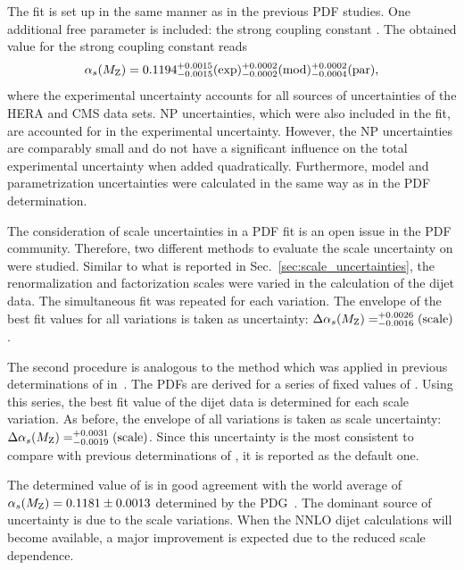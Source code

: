 The fit is set up in the same manner as
in the previous PDF studies. One additional free parameter is included: the
strong coupling constant \asmz. The obtained value for the strong coupling constant
reads
%
\begin{equation*}
  \alpha_{s}(M_\mathrm{Z}) = 0.1194_{-0.0015}^{+0.0015}(\mathrm{exp})_{-0.0002}^{+0.0002}(\mathrm{mod})_{-0.0004}^{+0.0002}(\mathrm{par}),
\end{equation*}
%
where the experimental uncertainty accounts for all sources of uncertainties of
the HERA and CMS data sets. NP uncertainties, which were also included in the
fit, are accounted for in the experimental uncertainty. However, the NP
uncertainties are comparably small and do not have a significant influence on the total
experimental uncertainty when added quadratically. Furthermore, model and parametrization uncertainties
were calculated in the same way as in the PDF determination. 

The consideration of scale uncertainties in a PDF fit is an open issue in the
PDF community. Therefore, two different methods to evaluate the scale uncertainty on \asmz were
studied. Similar to what is reported in Sec.~\ref{sec:scale_uncertainties}, the
renormalization and factorization scales were varied in the calculation of the
dijet data. The simultaneous fit was repeated for each variation. The envelope
of the best fit \asmz values for all variations is taken as uncertainty:
$\Delta\alpha_{s}(M_\mathrm{Z})= _{-0.0016}^{+0.0026}(\mathrm{scale})$.

The second procedure is analogous to the method which was applied in previous
determinations of \asmz \eg in~\cite{CMS:2014mna,Khachatryan:2014waa}. The PDFs
are derived for a series of fixed values of \asmz. Using this series, the best
fit \asmz value of the dijet data is determined for each scale variation. As
before, the envelope of all variations is taken as scale uncertainty: $\Delta
\alpha_{s}(M_\mathrm{Z}) = _{-0.0019}^{+0.0031}(\mathrm{scale})$. Since this uncertainty is the
most consistent to compare with previous determinations of \asmz, it is reported
as the default one. 

The determined value of \asmz is in good agreement with the world average of
$\alpha_{s}(M_\mathrm{Z})=0.1181\pm 0.0013$ determined by the PDG~\cite{Agashe:2014kda}. The
dominant source of uncertainty is due to the scale variations. When the NNLO
dijet calculations will become available, a major improvement is expected due to the
reduced scale dependence.

